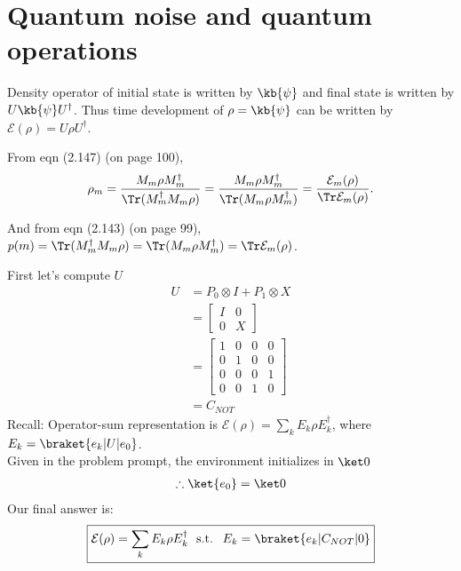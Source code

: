 \chapter{Quantum noise and quantum operations}
Density operator of initial state is written by $\kb{\psi}$ and final state is written by $U\kb{\psi}U^\dagger$.
Thus time development of $\rho = \kb{\psi}$ can be written by $\mathcal{E}(\rho) = U\rho U^\dagger$.

From eqn (2.147) (on page 100),
\begin{align*}
	\rho_m = \frac{M_m \rho M_m^\dagger}{\Tr (M_m^\dagger  M_m\rho ) }
					= \frac{M_m \rho M_m^\dagger}{\Tr ( M_m \rho M_m^\dagger ) }
					= \frac{\mathcal{E}_m (\rho)}{\Tr \mathcal{E}_m (\rho)}.
\end{align*}

And from eqn (2.143) (on page 99), $p(m) = \Tr (M_m^\dagger M_m \rho) = \Tr (M_m \rho M_m^\dagger) = \Tr \mathcal{E}_m (\rho)$.





First let's compute $U$
\begin{align*}
    U & = P_0 \otimes I + P_1 \otimes X\\
    & = \begin{bmatrix} I & 0 \\ 0 & X \end{bmatrix}\\
    & = \begin{bmatrix} 1 &0 & 0 & 0\\
    0 & 1 & 0 & 0\\
    0 & 0 & 0 & 1\\
    0 & 0 & 1 & 0
    \end{bmatrix}\\
    & = C_{NOT}
\end{align*}
Recall: Operator-sum representation is $\mathcal E(\rho) = \sum_k E_k \rho E_k^\dagger$, where $E_k = \braket{e_k | U | e_0}$.\\
Given in the problem prompt, the environment initializes in $\ket 0$
\begin{align*}
    \therefore \ket{e_0} = \ket 0
\end{align*}
Our final answer is:
\begin{align*}
    \boxed{\mathcal E(\rho) = \sum_k E_k \rho E_k^\dagger \  \text{ s.t. } \ E_k = \braket{e_k | C_{NOT} | 0}}
\end{align*}


